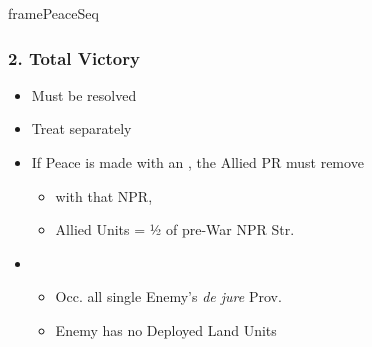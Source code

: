 \documentclass[10pt]{article}
\newlength{\fhPeaceSeq} \setlength\fhPeaceSeq{32\baselineskip}
\begin{document}
\begin{dynamiccontents*}{framePeaceSeq}
\begin{eubox}{\fhPeaceSeq}
\begin{multicols}{2}
		\subsubsection*{2. Total Victory}
		\begin{itemize}
			\item Must be resolved
			\item Treat  separately
			\item If Peace is made with an , the Allied PR must remove
			\begin{itemize}
				\item \alliance with that NPR, 
				\item Allied Units = ½ of pre-War NPR Str.
			\end{itemize}
			\item {}
			\begin{itemize}
				\item Occ. all single Enemy's \emph{de jure} Prov.
				\item Enemy has no Deployed Land Units
			\end{itemize}
		\end{itemize}


\end{multicols}
\end{eubox}
\end{dynamiccontents*}
\end{document}
